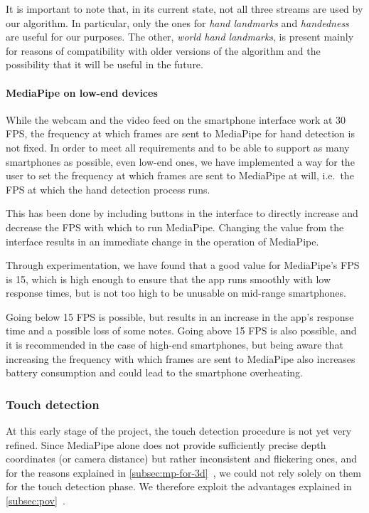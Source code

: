 It is important to note that, in its current state, not all three streams are used by our algorithm.
In particular, only the ones for \textit{hand landmarks} and \textit{handedness} are useful for our purposes.
The other, \textit{world hand landmarks}, is present mainly for reasons of compatibility with older
versions of the algorithm and the possibility that it will be useful in the future.

\paragraph{MediaPipe on low-end devices}
While the webcam and the video feed on the smartphone interface work at 30 FPS,
the frequency at which frames are sent to MediaPipe for hand detection is not fixed.
In order to meet all requirements and to be able to support as many smartphones as possible,
even low-end ones, we have implemented a way for the user to set the frequency at which frames are sent to
MediaPipe at will, i.e.\ the FPS at which the hand detection process runs.

This has been done by including buttons in the interface to directly increase and decrease the FPS with which to run MediaPipe.
Changing the value from the interface results in an immediate change in the operation of MediaPipe.

Through experimentation, we have found that a good value for MediaPipe's FPS is 15, which is high enough
to ensure that the app runs smoothly with low response times, but is not too high to be unusable on mid-range smartphones.

Going below 15 FPS is possible, but results in an increase in the app's response time and a possible loss of some notes.
Going above 15 FPS is also possible, and it is recommended in the case of high-end smartphones,
but being aware that increasing the frequency with which frames are sent to
MediaPipe also increases battery consumption and could lead to the smartphone overheating.

\subsubsection{Touch detection}
At this early stage of the project, the touch detection procedure is not yet very refined.
Since MediaPipe alone does not provide sufficiently precise depth coordinates (or camera distance) but rather
inconsistent and flickering ones, and for the reasons explained in \autoref{subsec:mp-for-3d}~,
we could not rely solely on them for the touch detection phase.
We therefore exploit the advantages explained in \autoref{subsec:pov}~.

